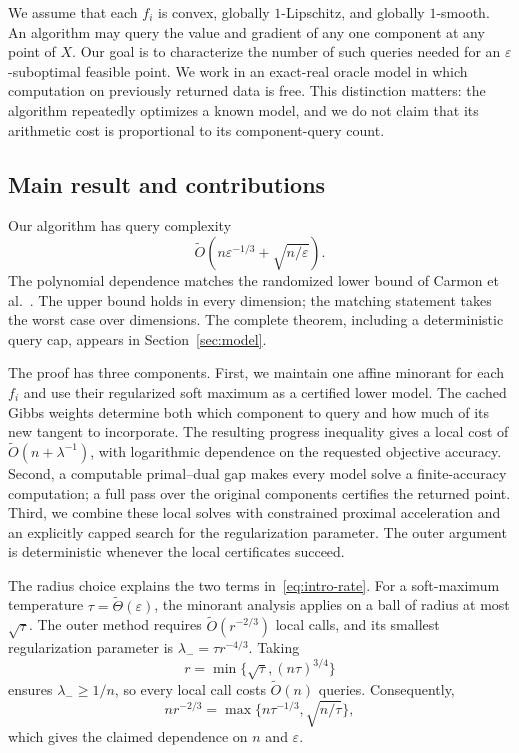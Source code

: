\documentclass[11pt,a4paper]{article}
\theoremstyle{definition}\newtheorem{definition}[theorem]{Definition}
\theoremstyle{remark}\newtheorem{remark}[theorem]{Remark}
\newcommand{\eps}{\varepsilon}
\newcommand{\tO}{\widetilde O}
\begin{document}
We assume that each $f_i$ is convex, globally $1$-Lipschitz, and globally
$1$-smooth. An algorithm may query the value and gradient of any one
component at any point of $X$. Our goal is to characterize the number of
such queries needed for an $\eps$-suboptimal feasible point. We work in an
exact-real oracle model in which computation on previously returned data
is free. This distinction matters: the algorithm repeatedly optimizes a
known model, and we do not claim that its arithmetic cost is proportional
to its component-query count.

\subsection{Main result and contributions}
Our algorithm has query complexity
\begin{equation}\label{eq:intro-rate}
  \tO\!\left(n\eps^{-1/3}+\sqrt{n/\eps}\right).
\end{equation}
The polynomial dependence matches the randomized lower bound of
Carmon et al.~\cite[Theorem~10]{inside}. The upper bound holds in every
dimension; the matching statement takes the worst case over dimensions.
The complete theorem, including a deterministic query cap, appears in
Section~\ref{sec:model}.

The proof has three components. First, we maintain one affine minorant
for each $f_i$ and use their regularized soft maximum as a certified lower
model. The cached Gibbs weights determine both which component to query
and how much of its new tangent to incorporate. The resulting progress
inequality gives a local cost of $\tO(n+\lambda^{-1})$, with logarithmic
dependence on the requested objective accuracy. Second, a computable
primal--dual gap makes every model solve a finite-accuracy computation;
a full pass over the original components certifies the returned point.
Third, we combine these local solves with constrained proximal acceleration
and an explicitly capped search for the regularization parameter. The
outer argument is deterministic whenever the local certificates succeed.

The radius choice explains the two terms in~\eqref{eq:intro-rate}.
For a soft-maximum temperature $\tau=\widetilde\Theta(\eps)$, the minorant
analysis applies on a ball of radius at most $\sqrt\tau$. The outer
method requires $\widetilde O(r^{-2/3})$ local calls, and its smallest
regularization parameter is $\lambda_-=\tau r^{-4/3}$. Taking
\[
 r=\min\{\sqrt\tau,(n\tau)^{3/4}\}
\]
ensures $\lambda_-\ge1/n$, so every local call costs $\tO(n)$ queries.
Consequently,
\[
 nr^{-2/3}=\max\{n\tau^{-1/3},\sqrt{n/\tau}\},
\]
which gives the claimed dependence on $n$ and $\eps$.
\end{document}

